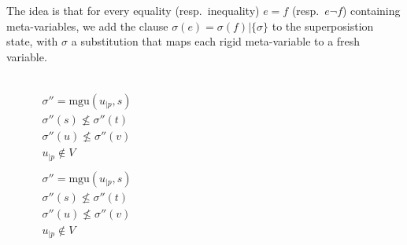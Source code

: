The idea is that for every equality (resp.~inequality) $e = f$ (resp.~$e \neg f$) containing meta-variables,
we add the clause $\sigma(e) = \sigma(f) | \{ \sigma \}$ to the superposistion state, with
$\sigma$ a substitution that maps each rigid meta-variable to a fresh variable.


\begin{figure}
  \begin{center}

    \DP{} \\[12pt]

    \DP{}
    $\begin{matrix}
        \sigma'' = \text{mgu}(u_{|p}, s) \\
        \sigma''(s) \not\leq \sigma''(t) \\
        \sigma''(u) \not\leq \sigma''(v) \\
        u_{|p} \not\in V \\
    \end{matrix}$ \\[12pt]

    \DP{}
    $\begin{matrix}
        \sigma'' = \text{mgu}(u_{|p}, s) \\
        \sigma''(s) \not\leq \sigma''(t) \\
        \sigma''(u) \not\leq \sigma''(v) \\
        u_{|p} \not\in V \\
    \end{matrix}$ \\[12pt]

    \doubleLine{}
    \DP{} \\[12pt]

    \doubleLine{}
    \DP{} \\[12pt]



\end{center}
\end{figure}
